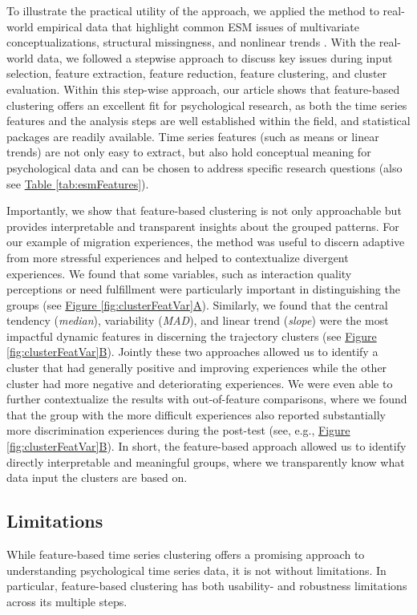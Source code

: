 \documentclass[man, 12pt, a4paper, floatsintext]{apa7}
\theoremstyle{break}
\theoremstyle{plain}
\newcommand{\fgrref}[2][]{\hyperref[#2]{Figure \ref*{#2}#1}}
\newcommand{\tblref}[2][]{\hyperref[#2]{Table \ref*{#2}#1}}
\begin{document}
To illustrate the practical utility of the approach, we applied the method to real-world empirical data that highlight common ESM issues of multivariate conceptualizations, structural missingness, and nonlinear trends \citep[e.g.,][]{ariens2020}. With the real-world data, we followed a stepwise approach to discuss key issues during input selection, feature extraction, feature reduction, feature clustering, and cluster evaluation. Within this step-wise approach, our article shows that feature-based clustering offers an excellent fit for psychological research, as both the time series features and the analysis steps are well established within the field, and statistical packages are readily available. Time series features (such as means or linear trends) are not only easy to extract, but also hold conceptual meaning for psychological data and can be chosen to address specific research questions (also see \tblref{tab:esmFeatures}).

Importantly, we show that feature-based clustering is not only approachable but provides interpretable and transparent insights about the grouped patterns. For our example of migration experiences, the method was useful to discern adaptive from more stressful experiences and helped to contextualize divergent experiences. We found that some variables, such as interaction quality perceptions or need fulfillment were particularly important in distinguishing the groups (see \fgrref[A]{fig:clusterFeatVar}). Similarly, we found that the central tendency (\textit{median}), variability (\textit{MAD}), and linear trend (\textit{slope}) were the most impactful dynamic features in discerning the trajectory clusters (see \fgrref[B]{fig:clusterFeatVar}). Jointly these two approaches allowed us to identify a cluster that had generally positive and improving experiences while the other cluster had more negative and deteriorating experiences. We were even able to further contextualize the results with out-of-feature comparisons, where we found that the group with the more difficult experiences also reported substantially more discrimination experiences during the post-test (see, e.g., \fgrref[B]{fig:clusterFeatVar}). In short, the feature-based approach allowed us to identify directly interpretable and meaningful groups, where we transparently know what data input the clusters are based on.

\subsection{Limitations}
While feature-based time series clustering offers a promising approach to understanding psychological time series data, it is not without limitations. In particular, feature-based clustering has both usability- and robustness limitations across its multiple steps. 
\end{document}

